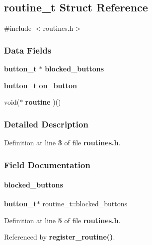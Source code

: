 \subsection{routine\+\_\+t Struct Reference}
\label{structroutine__t}


{\ttfamily \#include $<$routines.\+h$>$}

\subsubsection*{Data Fields}
\begin{DoxyCompactItemize}
\item 
\textbf{ button\+\_\+t} $\ast$ \textbf{ blocked\+\_\+buttons}
\item 
\textbf{ button\+\_\+t} \textbf{ on\+\_\+button}
\item 
void($\ast$ \textbf{ routine} )()
\end{DoxyCompactItemize}


\subsubsection{Detailed Description}


Definition at line \textbf{ 3} of file \textbf{ routines.\+h}.



\subsubsection{Field Documentation}
\mbox{\label{structroutine__t_a8d278c682e01bd513956f9902772812a}} 
\paragraph{blocked\+\_\+buttons}
{\footnotesize\ttfamily \textbf{ button\+\_\+t}$\ast$ routine\+\_\+t\+::blocked\+\_\+buttons}



Definition at line \textbf{ 5} of file \textbf{ routines.\+h}.



Referenced by \textbf{ register\+\_\+routine()}.

\mbox{\label{structroutine__t_a4600cad285b5643e422cb5bfe6ce7fa4}} 
